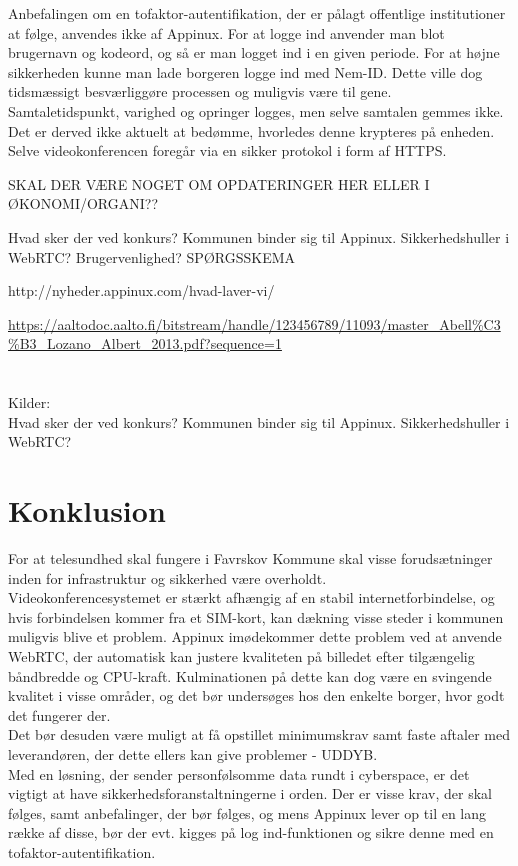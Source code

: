 Anbefalingen om en tofaktor-autentifikation, der er pålagt offentlige institutioner at følge, anvendes ikke af Appinux. For at logge ind anvender man blot brugernavn og kodeord, og så er man logget ind i en given periode. For at højne sikkerheden kunne man lade borgeren logge ind med Nem-ID. Dette ville dog tidsmæssigt besværliggøre processen og muligvis være til gene.\\
Samtaletidspunkt, varighed og opringer logges, men selve samtalen gemmes ikke. Det er derved ikke aktuelt at bedømme, hvorledes denne krypteres på enheden. Selve videokonferencen foregår via en sikker protokol i form af HTTPS.

SKAL DER VÆRE NOGET OM OPDATERINGER HER ELLER I ØKONOMI/ORGANI??

Hvad sker der ved konkurs? Kommunen binder sig til Appinux.
Sikkerhedshuller i WebRTC? Brugervenlighed? SPØRGSSKEMA

http://nyheder.appinux.com/hvad-laver-vi/

\url{https://aaltodoc.aalto.fi/bitstream/handle/123456789/11093/master_Abell%C3%B3_Lozano_Albert_2013.pdf?sequence=1}
\\ \\ \\
Kilder:
\\
Hvad sker der ved konkurs? Kommunen binder sig til Appinux.
Sikkerhedshuller i WebRTC?

\section{Konklusion}
For at telesundhed skal fungere i Favrskov Kommune skal visse forudsætninger inden for infrastruktur og sikkerhed være overholdt.\\
Videokonferencesystemet er stærkt afhængig af en stabil internetforbindelse, og hvis forbindelsen kommer fra et SIM-kort, kan dækning visse steder i kommunen muligvis blive et problem. Appinux imødekommer dette problem ved at anvende WebRTC, der automatisk kan justere kvaliteten på billedet efter tilgængelig båndbredde og CPU-kraft. Kulminationen på dette kan dog være en svingende kvalitet i visse områder, og det bør undersøges hos den enkelte borger, hvor godt det fungerer der.\\
Det bør desuden være muligt at få opstillet minimumskrav samt faste aftaler med leverandøren, der dette ellers kan give problemer - UDDYB.\\
Med en løsning, der sender personfølsomme data rundt i cyberspace, er det vigtigt at have sikkerhedsforanstaltningerne i orden. Der er visse krav, der skal følges, samt anbefalinger, der bør følges, og mens Appinux lever op til en lang række af disse, bør der evt. kigges på log ind-funktionen og sikre denne med en tofaktor-autentifikation.